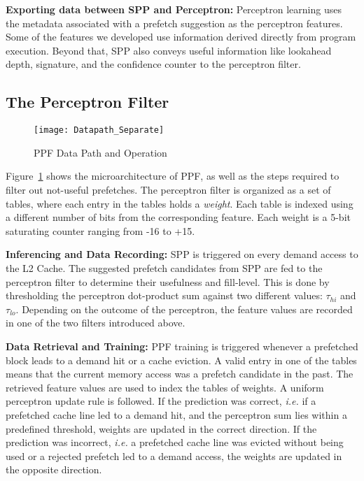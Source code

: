 \noindent \textbf{Exporting data between SPP and Perceptron:}
Perceptron learning uses the metadata associated with a prefetch suggestion as
the perceptron features. Some of the features we developed use information
derived directly from program execution. Beyond that, SPP also conveys useful
information like lookahead depth, signature, and the confidence counter to the
perceptron filter.

\subsection{The Perceptron Filter}
\label{Enhancements-PPF}

\begin{figure}[ht]
  \begin{center}
  \texttt{[image: Datapath\_Separate]}
  \caption{PPF Data Path and Operation}
  \label{fig:PPF_Datapath}
  \end{center}
\end{figure}

Figure~\ref{fig:PPF_Datapath} shows the microarchitecture of PPF, as well as
the steps required to filter out not-useful prefetches. The perceptron filter
is organized as a set of tables, where each entry in the tables holds a
\textit{weight}. Each table is indexed using a different number of bits from
the corresponding feature. Each weight is a 5-bit saturating counter ranging
from -16 to +15.

\noindent \textbf{Inferencing and Data Recording:}
SPP is triggered on every demand access to the L2 Cache. The suggested 
prefetch candidates from SPP are fed to the perceptron filter to determine 
their usefulness and fill-level. This is done by thresholding the perceptron 
dot-product sum against two different values: $\tau_{hi}$ and $\tau_{lo}$.
Depending on the outcome of the perceptron, the feature values are recorded
in one of the two filters introduced above.

\noindent \textbf{Data Retrieval and Training:}
PPF training is triggered whenever a prefetched block leads to a demand hit or
a cache eviction. A valid entry in one of the tables means that the current
memory access was a prefetch candidate in the past. The retrieved feature
values are used to index the tables of weights. A uniform perceptron update
rule is followed. If the prediction was correct, {\em i.e.} if a prefetched
cache line led to a demand hit, and the perceptron sum lies within a
predefined threshold, weights are updated in the correct direction. If the
prediction was incorrect, {\em i.e.} a prefetched cache line was evicted
without being used or a rejected prefetch led to a demand access, the weights
are updated in the opposite direction.

